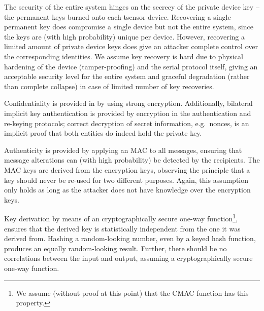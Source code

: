 The security of the entire system hinges on the secrecy of the private device key -- the permanent keys burned onto each tsensor device. Recovering a single permanent key does compromise a single device but not the entire system, since the keys are (with high probability) unique per device. However, recovering a limited amount of private device keys does give an attacker complete control over the corresponding identities. We assume key recovery is hard due to physical hardening of the device (tamper-proofing) and the serial protocol itself, giving an acceptable security level for the entire system and graceful degradation (rather than complete collapse) in case of limited number of key recoveries.

Confidentiality is provided in by using strong encryption. Additionally, bilateral implicit key authentication  is provided by encryption in the authentication and re-keying protocols; correct decryption of secret information, e.g.\ nonces, is an implicit proof that both entities do indeed hold the private key.

Authenticity is provided by applying an MAC to all messages, ensuring that message alterations can (with high probability) be detected by the recipients. The MAC keys are derived from the encryption keys, observing the principle that a key should never be re-used for two different purposes.
Again, this assumption only holds as long as the attacker does not have knowledge over the encryption keys. 

Key derivation by means of an cryptographically secure one-way function\footnote{We assume (without proof at this point) that the CMAC function has this property.}, ensures that the derived key is statistically independent from the one it was derived from. Hashing a random-looking number, even by a keyed hash function, produces an equally random-looking result. Further, there should be no correlations between the input and output, assuming a cryptographically secure one-way function.


